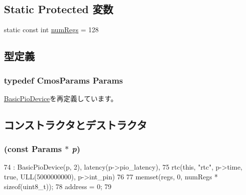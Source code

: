 \subsection*{Static Protected 変数}
\begin{DoxyCompactItemize}
\item 
static const int \hyperlink{classX86ISA_1_1Cmos_a443de50008cc375e38503522f5f3cf02}{numRegs} = 128
\end{DoxyCompactItemize}


\subsection{型定義}
\hypertarget{classX86ISA_1_1Cmos_a22dfc4a3fb18df74d309b9996cd9943c}{
\subsubsection[{Params}]{\setlength{\rightskip}{0pt plus 5cm}typedef CmosParams {\bf Params}}}
\label{classX86ISA_1_1Cmos_a22dfc4a3fb18df74d309b9996cd9943c}


\hyperlink{classBasicPioDevice_a2845515ac6467f10540747053c8a0449}{BasicPioDevice}を再定義しています。

\subsection{コンストラクタとデストラクタ}
\hypertarget{classX86ISA_1_1Cmos_a7ecd69b26388cf0408175e7cde6de621}{
\subsubsection[{Cmos}]{ (const {\bf Params} $\ast$ {\em p})}}
\label{classX86ISA_1_1Cmos_a7ecd69b26388cf0408175e7cde6de621}



\begin{DoxyCode}
74                           : BasicPioDevice(p, 2), latency(p->pio_latency),
75         rtc(this, "rtc", p->time, true, ULL(5000000000), p->int_pin)
76     {
77         memset(regs, 0, numRegs * sizeof(uint8_t));
78         address = 0;
79     }
\end{DoxyCode}


